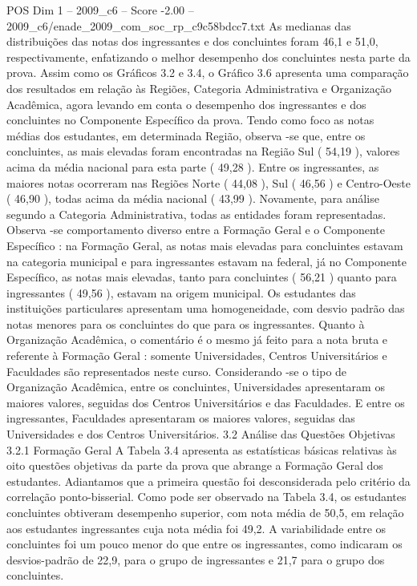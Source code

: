 \begin{textsample}{POS Dim 1 – 2009\_c6 – Score -2.00 – 2009\_c6/enade\_2009\_com\_soc\_rp\_c9c58bdcc7.txt}
As medianas das distribuições das notas dos ingressantes e dos concluintes foram 46,1 e 51,0, respectivamente, enfatizando o melhor desempenho dos concluintes nesta parte da prova.
Assim como os Gráficos 3.2 e 3.4, o Gráfico 3.6 apresenta uma comparação dos resultados em relação às Regiões, Categoria Administrativa e Organização Acadêmica, agora levando em conta o desempenho dos ingressantes e dos concluintes no Componente Específico da prova.
Tendo como foco as notas médias dos estudantes, em determinada Região, observa -se que, entre os concluintes, as mais elevadas foram encontradas na Região Sul ( 54,19 ), valores acima da média nacional para esta parte ( 49,28 ).
Entre os ingressantes, as maiores notas ocorreram nas Regiões Norte ( 44,08 ), Sul ( 46,56 ) e Centro-Oeste ( 46,90 ), todas acima da média nacional ( 43,99 ).
Novamente, para análise segundo a Categoria Administrativa, todas as entidades foram representadas.
Observa -se comportamento diverso entre a Formação Geral e o Componente Específico : na Formação Geral, as notas mais elevadas para concluintes estavam na categoria municipal e para ingressantes estavam na federal, já no Componente Específico, as notas mais elevadas, tanto para concluintes ( 56,21 ) quanto para ingressantes ( 49,56 ), estavam na origem municipal.
Os estudantes das instituições particulares apresentam uma homogeneidade, com desvio padrão das notas menores para os concluintes do que para os ingressantes.
Quanto à Organização Acadêmica, o comentário é o mesmo já feito para a nota bruta e referente à Formação Geral : somente Universidades, Centros Universitários e Faculdades são representados neste curso.
Considerando -se o tipo de Organização Acadêmica, entre os concluintes, Universidades apresentaram os maiores valores, seguidas dos Centros Universitários e das Faculdades.
E entre os ingressantes, Faculdades apresentaram os maiores valores, seguidas das Universidades e dos Centros Universitários. 3.2 Análise das Questões Objetivas 3.2.1 Formação Geral A Tabela 3.4 apresenta as estatísticas básicas relativas às oito questões objetivas da parte da prova que abrange a Formação Geral dos estudantes.
Adiantamos que a primeira questão foi desconsiderada pelo critério da correlação ponto-bisserial.
Como pode ser observado na Tabela 3.4, os estudantes concluintes obtiveram desempenho superior, com nota média de 50,5, em relação aos estudantes ingressantes cuja nota média foi 49,2.
A variabilidade entre os concluintes foi um pouco menor do que entre os ingressantes, como indicaram os desvios-padrão de 22,9, para o grupo de ingressantes e 21,7 para o grupo dos concluintes.

\end{textsample}

